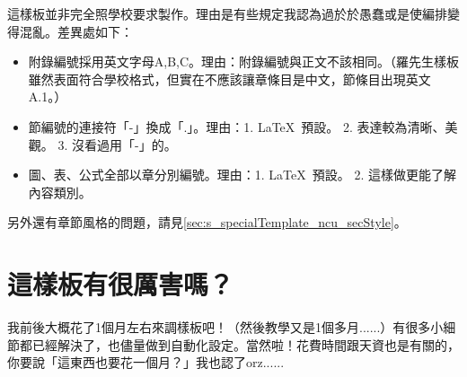 \documentclass[class=NCU_thesis, crop=false, float=true]{standalone}
\begin{document}
這樣板並非完全照學校要求製作。理由是有些規定我認為過於於愚蠢或是使編排變得混亂。差異處如下：
\begin{itemize}
    \item 附錄編號採用英文字母A,B,C。理由：附錄編號與正文不該相同。（羅先生樣板雖然表面符合學校格式，但實在不應該讓章條目是中文，節條目出現英文A.1。）
    \item 節編號的連接符「-」換成「.」。理由：1. \LaTeX\ 預設。 2. 表達較為清晰、美觀。 3. 沒看過用「-」的。
    \item 圖、表、公式全部以章分別編號。理由：1. \LaTeX\ 預設。 2. 這樣做更能了解內容類別。
\end{itemize}
另外還有章節風格的問題，請見\cref{sec:s_specialTemplate_ncu_secStyle}。

\section{這樣板有很厲害嗎？}
我前後大概花了1個月左右來調樣板吧！（然後教學又是1個多月......）有很多小細節都已經解決了，也儘量做到自動化設定。當然啦！花費時間跟天資也是有關的，你要說「這東西也要花一個月？」我也認了orz......
\end{document}
